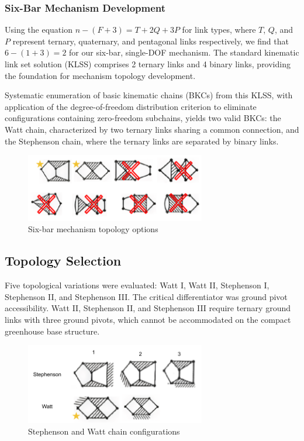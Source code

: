 \documentclass[12pt]{article}
\begin{document}
\subsubsection*{Six-Bar Mechanism Development}
Using the equation $n-(F+3)=T+2Q+3P$ for link types, where $T$, $Q$, and $P$ represent ternary, quaternary, and pentagonal links respectively, we find that $6-(1+3)=2$ for our six-bar, single-DOF mechanism. The standard kinematic link set solution (KLSS) comprises 2 ternary links and 4 binary links, providing the foundation for mechanism topology development.

Systematic enumeration of basic kinematic chains (BKCs) from this KLSS, with application of the degree-of-freedom distribution criterion to eliminate configurations containing zero-freedom subchains, yields two valid BKCs: the Watt chain, characterized by two ternary links sharing a common connection, and the Stephenson chain, where the ternary links are separated by binary links.

\begin{figure}[H]
    \centering
    \includegraphics[width=0.7\textwidth]{../03_Images/6 Bar options.png}
    \caption{Six-bar mechanism topology options}
    \label{fig:six_bar_options}
\end{figure}

\subsection*{Topology Selection}

Five topological variations were evaluated: Watt I, Watt II, Stephenson I, Stephenson II, and Stephenson III. The critical differentiator was ground pivot accessibility. Watt II, Stephenson II, and Stephenson III require ternary ground links with three ground pivots, which cannot be accommodated on the compact greenhouse base structure.

\begin{figure}[H]
    \centering
    \includegraphics[width=0.7\textwidth]{../03_Images/Stephenson and Watt.png}
    \caption{Stephenson and Watt chain configurations}
    \label{fig:stephenson_watt}
\end{figure}
\end{document}

